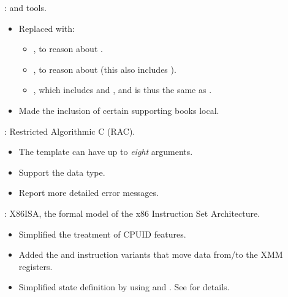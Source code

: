 \begin{frame}

\implibtitle

:
 and  tools.
\begin{itemize}
\item Replaced  with:
      \begin{itemize}
      \item {}, to reason about .
      \item {}, to reason about 
            (this also includes ).
      \item {},
            which includes  and ,
            and is thus the same as .
      \end{itemize}
\item Made the inclusion of certain supporting books local.
\end{itemize}

\end{frame}


\begin{frame}

\implibtitle

:
Restricted Algorithmic C (RAC).
\begin{itemize}
\item The  template can have up to {\em eight} arguments.
\item Support the  data type.
\item Report more detailed error messages.
\end{itemize}

\end{frame}


\begin{frame}

\implibtitle

:
X86ISA, the formal model of the x86 Instruction Set Architecture.
\begin{itemize}
\item Simplified the treatment of CPUID features.
\item Added the  and  instruction variants
      that move data from/to the XMM registers.
\item Simplified state definition by using
       and . See
       for details.
\end{itemize}

\end{frame}

